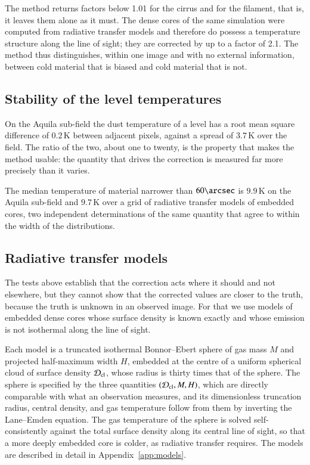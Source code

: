 \documentclass{aa}
\begin{document}
The method returns factors below 1.01 for the cirrus and for the filament, that
is, it leaves them alone as it must. The dense cores of the same simulation
were computed from radiative transfer models and therefore do possess a
temperature structure along the line of sight; they are corrected by up to a
factor of 2.1. The method thus distinguishes, within one image and with no
external information, between cold material that is biased and cold material
that is not.

\subsection{Stability of the level temperatures}
\label{sec:stability}

On the Aquila sub-field the dust temperature of a level has a root mean square
difference of $0.2$\,K between adjacent pixels, against a spread of $3.7$\,K
over the field. The ratio of the two, about one to twenty, is the property that
makes the method usable: the quantity that drives the correction is measured
far more precisely than it varies.

The median temperature of material narrower than $60\arcsec$ is $9.9$\,K on the
Aquila sub-field and $9.7$\,K over a grid of radiative transfer models of
embedded cores, two independent determinations of the same quantity that agree
to within the width of the distributions.

\subsection{Radiative transfer models}
\label{sec:models}

The tests above establish that the correction acts where it should and not
elsewhere, but they cannot show that the corrected values are closer to the
truth, because the truth is unknown in an observed image. For that we use
models of embedded dense cores whose surface density is known exactly and
whose emission is not isothermal along the line of sight.

Each model is a truncated isothermal Bonnor--Ebert sphere
\citep{Ebert1955, Bonnor1956} of gas mass $M$ and projected half-maximum
width $H$, embedded at the centre of a uniform spherical cloud of surface
density $\mathcal{D}_{\rm cl}$, whose radius is thirty times that of the sphere.
The sphere is specified by the three quantities $(\mathcal{D}_{\rm cl}, M, H)$,
which are directly comparable with what an observation measures, and its
dimensionless truncation radius, central density, and gas temperature follow
from them by inverting the Lane--Emden equation. The gas temperature of the
sphere is solved self-consistently against the total surface density along its
central line of sight, so that a more deeply embedded core is colder, as
radiative transfer requires. The models are described in detail in
Appendix~\ref{app:models}.
\end{document}
